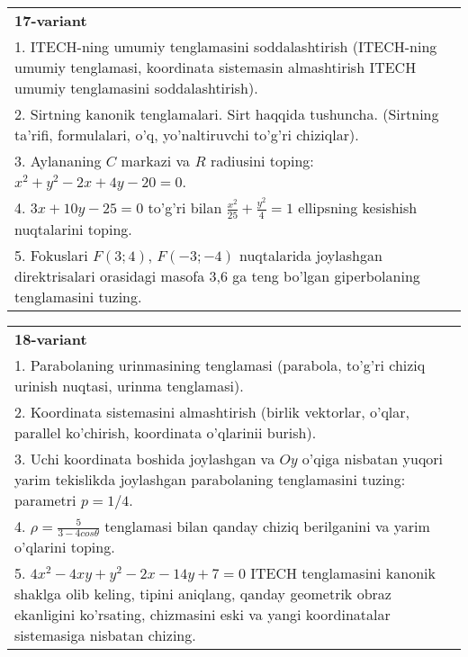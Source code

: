 \documentclass{article}
\begin{document}
\begin{tabular}{m{17cm}}
\textbf{17-variant}\\
1. ITECH-ning umumiy tenglamasini soddalashtirish (ITECH-ning umumiy tenglamasi, koordinata sistemasin almashtirish ITECH umumiy tenglamasini soddalashtirish).\\

2. Sirtning kanonik tenglamalari. Sirt haqqida tushuncha. (Sirtning ta'rifi, formulalari, o'q, yo'naltiruvchi to'g'ri chiziqlar).\\

3. Aylananing $C$ markazi va $R$ radiusini toping: $x^2+y^2-2x+4y-20=0$.\\

4. $3x + 10y - 25 = 0$ to'g'ri bilan $\frac{x^{2}}{25} + \frac{y^{2}}{4} = 1$ ellipsning kesishish nuqtalarini toping.  \\

5. Fokuslari $F(3;4)$, $F(-3;-4)$ nuqtalarida joylashgan direktrisalari orasidagi masofa 3,6 ga teng bo'lgan giperbolaning tenglamasini tuzing.  
\end{tabular}
\vspace{1cm}


\begin{tabular}{m{17cm}}
\textbf{18-variant}\\
1. Parabolaning urinmasining tenglamasi (parabola, to'g'ri chiziq urinish nuqtasi, urinma tenglamasi).\\

2. Koordinata sistemasini almashtirish (birlik vektorlar, o'qlar, parallel ko'chirish, koordinata o'qlarinii burish).\\

3. Uchi koordinata boshida joylashgan va $Oy$ o'qiga nisbatan yuqori yarim tekislikda joylashgan parabolaning tenglamasini tuzing: parametri $p=1/4$.\\

4. $\rho = \frac{5}{3 - 4cos\theta}$ tenglamasi bilan qanday chiziq berilganini va yarim o'qlarini toping.  \\

5. $4x^{2} - 4xy + y^{2} - 2x - 14y + 7 = 0$ ITECH tenglamasini kanonik shaklga olib keling, tipini aniqlang, qanday geometrik obraz ekanligini ko'rsating, chizmasini eski va yangi koordinatalar sistemasiga nisbatan chizing.  
\end{tabular}
\vspace{1cm}
\end{document}
